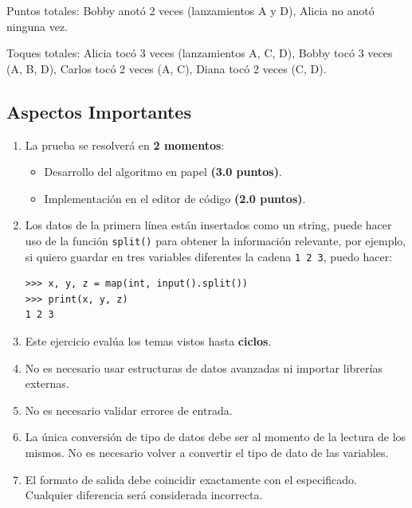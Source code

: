 \documentclass[11pt,a4paper]{article}
\begin{document}
Puntos totales: Bobby anotó 2 veces (lanzamientos A y D), Alicia no anotó ninguna vez.

Toques totales: Alicia tocó 3 veces (lanzamientos A, C, D), Bobby tocó 3 veces (A, B, D), Carlos tocó 2 veces (A, C), Diana tocó 2 veces (C, D).


\subsection*{Aspectos Importantes}

\begin{enumerate}
  \item La prueba se resolverá en \textbf{2 momentos}:
        \begin{itemize}
            \item Desarrollo del algoritmo en papel \textbf{(3.0 puntos)}.
            \item Implementación en el editor de código \textbf{(2.0 puntos)}.
        \end{itemize}

  \item Los datos de la primera línea están insertados como un string, puede hacer uso de la función \lstinline[style=pythonstyle]|split()| para obtener la información relevante, por ejemplo, si quiero guardar en tres variables diferentes la cadena \texttt{1 2 3}, puedo hacer:
        \begin{lstlisting}[style=pythonstyle]
>>> x, y, z = map(int, input().split())
>>> print(x, y, z)
1 2 3
        \end{lstlisting}

  \item Este ejercicio evalúa los temas vistos hasta \textbf{ciclos}.

  \item No es necesario usar estructuras de datos avanzadas ni importar librerías externas.

  \item No es necesario validar errores de entrada.

  \item La única conversión de tipo de datos debe ser al momento de la lectura de los mismos. No es necesario volver a convertir el tipo de dato de las variables.

  \item El formato de salida debe coincidir exactamente con el especificado. Cualquier diferencia será considerada incorrecta.
\end{enumerate}
\end{document}

